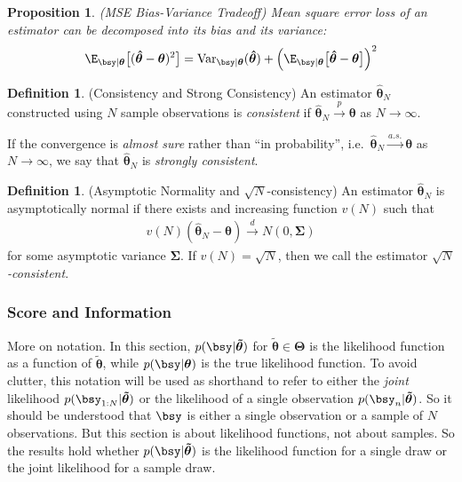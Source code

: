 \documentclass[12pt]{article}
\theoremstyle{plain}
\newtheorem{prop}[thm]{Proposition}
\theoremstyle{definition}
\newtheorem{defn}[thm]{Definition}
\theoremstyle{remark}
\newcommand{\ra}{\rightarrow}
\newcommand{\bstheta}{\boldsymbol{\theta}}
\newcommand{\bsTheta}{\boldsymbol{\Theta}}
\newcommand{\bsSigma}{\boldsymbol{\Sigma}}
\newcommand{\bshattheta}{\boldsymbol{\hat{\theta}}}
\newcommand{\bstildetheta}{\boldsymbol{\tilde{\theta}}}
\newcommand{\Var}{\operatorname{Var}}
\newcommand{\asto}{\xrightarrow{a.s.}}
\newcommand{\pto}{\xrightarrow{p}}
\newcommand{\dto}{\xrightarrow{d}}
\begin{document}
\begin{prop}\emph{(MSE Bias-Variance Tradeoff)}
Mean square error loss of an estimator can be decomposed into its bias
and its variance:
\begin{align*}
  \E_{\bsy|\bstheta}\big[(\bshattheta-\bstheta)^2\big]
  =\Var_{\bsy|\bstheta}(\bshattheta) +
  \left(\E_{\bsy|\bstheta}\big[\bshattheta-\bstheta\big]\right)^2
\end{align*}
\end{prop}

\begin{defn}(Consistency and Strong Consistency)
An estimator $\bshattheta_N$ constructed using $N$ sample observations
is \emph{consistent} if $\bshattheta_N\pto \bstheta$ as $N\ra\infty$.

If the convergence is \emph{almost sure} rather than ``in probability'',
i.e.\ $\bshattheta_N\asto \bstheta$ as $N\ra\infty$, we say that
$\bshattheta_N$ is \emph{strongly consistent}.
\end{defn}


\begin{defn}(Asymptotic Normality and $\sqrt{N}$-consistency)
An estimator $\bshattheta_N$ is asymptotically normal if there exists
and increasing function $v(N)$ such that
\begin{align*}
  v(N)(\bshattheta_N -\bstheta) \dto N(0,\bsSigma)
\end{align*}
for some asymptotic variance $\bsSigma$. If $v(N)=\sqrt{N}$, then we
call the estimator \emph{$\sqrt{N}$-consistent}.
\end{defn}



\clearpage
\subsubsection{Score and Information}

More on notation. In this section, $p(\bsy|\bstildetheta)$ for
$\bstildetheta\in\bsTheta$ is the likelihood function as a function of
$\bstildetheta$, while $p(\bsy|\bstheta)$ is the true likelihood
function.  To avoid clutter, this notation will be used as shorthand to
refer to either the \emph{joint} likelihood
$p(\bsy_{1:N}|\bstildetheta)$ or the likelihood of a single observation
$p(\bsy_n|\bstildetheta)$.  So it should be understood that $\bsy$ is
either a single observation or a sample of $N$ observations.  But this
section is about likelihood functions, not about samples. So the results
hold whether $p(\bsy|\bstildetheta)$ is the likelihood function for a
single draw or the joint likelihood for a sample draw.
\end{document}
